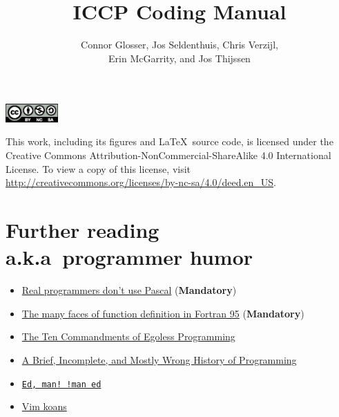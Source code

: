 \documentclass[justified, nofonts, symmetric, notoc, debug]{tufte-book}
\title{ICCP Coding Manual}
\author{Connor Glosser, Jos Seldenthuis, Chris Verzijl, \\ 
  Erin McGarrity, and Jos Thijssen}
\newcommand{\Chapter}[2]{\chapter[#1]{#1\\[1ex]\Large#2}}
\begin{document}
\frontmatter
\maketitle

\newpage
\null
\vfill
\begin{center}
  \includegraphics[width=0.15\textwidth]{figures/by-nc-sa.eps}
\end{center}
This work, including its figures and \LaTeX\ source code, is licensed under the Creative Commons Attribution-NonCommercial-ShareAlike 4.0 International License. 
To view a copy of this license, visit \url{http://creativecommons.org/licenses/by-nc-sa/4.0/deed.en_US}.

\tableofcontents


\mainmatter







\appendix




\backmatter
\Chapter{Further reading}{a.k.a\ programmer humor}
\begin{itemize}
  \item \href{http://www.pbm.com/~lindahl/real.programmers.html}{Real programmers don't use Pascal} (\textbf{Mandatory})
  \item \href{https://gist.github.com/alanbriolat/3135713#file-fortran_hell-f95}{The many faces of function definition in Fortran 95} (\textbf{Mandatory})
  \item \href{http://www.codinghorror.com/blog/2006/05/the-ten-commandments-of-egoless-programming.html}{The Ten Commandments of Egoless Programming}
  \item \href{http://james-iry.blogspot.com/2009/05/brief-incomplete-and-mostly-wrong.html}{A Brief, Incomplete, and Mostly Wrong History of Programming}
  \item \href{https://www.gnu.org/fun/jokes/ed-msg.html}{\texttt{Ed, man! !man ed}}
  \item \href{http://blog.sanctum.geek.nz/vim-koans/}{Vim koans}
\end{itemize}

\printindex
\end{document}
